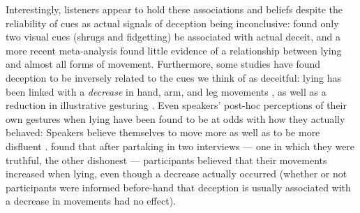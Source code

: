 \documentclass[a4paper,man,natbib]{apa6}
\begin{document}
Interestingly, listeners appear to hold these associations and beliefs despite the reliability of cues as actual signals of deception being inconclusive: \citet{Zuckerman1981} found only two visual cues (shrugs and fidgetting) be associated with actual deceit, and a more recent meta-analysis \citet{DePaulo2003} found little evidence of a relationship between lying and almost all forms of movement. %
Furthermore, some studies have found deception to be inversely related to the cues we think of as deceitful: lying has been linked with a \emph{decrease} in hand, arm, and leg movements \citep[e.g.][]{DePaulo1992, Ekman1989, Vrij1995}, as well as a reduction in illustrative gesturing \citep[e.g.][]{DePaulo2003, Cohen2010}.
Even speakers' post-hoc perceptions of their own gestures when lying have been found to be at odds with how they actually behaved:
Speakers believe themselves to move more \citep{Vrij1996} as well as to be more disfluent \citep{Zuckerman1981a}.
\citet{Vrij1996} found that after partaking in two interviews --- one in which they were truthful, the other dishonest --- participants believed that their movements increased when lying, even though a decrease actually occurred (whether or not participants were informed before-hand that deception is usually associated with a decrease in movements had no effect). %
\end{document}
